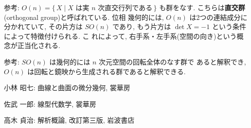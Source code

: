 \documentclass[12pt,twoside]{jarticle}
\begin{document}
\noindent 参考: 
\(
  O(n)
  =
  \{\, X \mid \text{$X$ は実 $n$ 次直交行列である} \,\}
\) %
も群をなす. こちらは{\bf 直交群}(orthogonal group)と呼ばれている. 位相
幾何的には, $O(n)$ は2つの連結成分に分かれていて, その片方は $SO(n)$ 
であり, もう片方は $\det X = - 1$ という条件によって特徴付けられる. こ
れによって, 右手系・左手系(空間の向き)という概念が正当化される. 

\noindent 参考: $SO(n)$ は幾何的には $n$ 次元空間の回転全体のなす群で
あると解釈でき, $O(n)$ は回転と鏡映から生成される群であると解釈できる.


\begin{thebibliography}{ABC}

小林 昭七: 曲線と曲面の微分幾何, 裳華房

佐武 一郎: 線型代数学, 裳華房

  高木 貞治: 解析概論, 改訂第三版, 岩波書店

\end{thebibliography}

\end{document}
